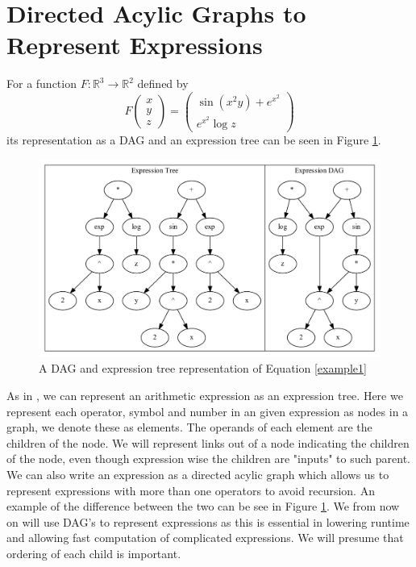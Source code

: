 \documentclass{article}
\begin{document}
\section{Directed Acylic Graphs to Represent Expressions}

For a function $F: \mathbb{R}^3 \rightarrow \mathbb{R}^2$ defined by
\begin{equation} \label{example1}
    F \begin{pmatrix}
        x \\ y \\ z
    \end{pmatrix} = \begin{pmatrix}
        \sin (x^2 y) + e^{x^2} \\ e^{x^2} \log z
    \end{pmatrix}
\end{equation}
its representation as a DAG and an expression tree can be seen in Figure \ref{fig:DAGgraph2}.

\begin{figure}[h]
    \centering
    \includegraphics[width=12cm]{images/Graph_Cluster_1.pdf}
    \caption{A DAG and expression tree representation of Equation \ref{example1}}
    \label{fig:DAGgraph2}
\end{figure}

As in \cite{PoPBook}, we can represent an arithmetic expression as an expression tree. Here we represent each operator, symbol and number in an given expression as nodes in a graph, we denote these as elements. The operands of each element are the children of the node. We will represent links out of a node indicating the children of the node, even though expression wise the children are "inputs" to such parent. We can also write an expression as a directed acylic graph which allows us to represent expressions with more than one operators to avoid recursion. An example of the difference between the two can be see in Figure \ref{fig:DAGgraph2}. We from now on will use DAG's to represent expressions as this is essential in lowering runtime and allowing fast computation of complicated expressions. We will presume that ordering of each child is important.
\end{document}
